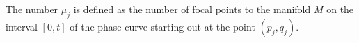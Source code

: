 The number $\mu_j$ is defined as the number of focal points to the manifold $M$ on the interval $[0, t]$ of the phase curve starting out at the point $(p_j, q_j)$.
